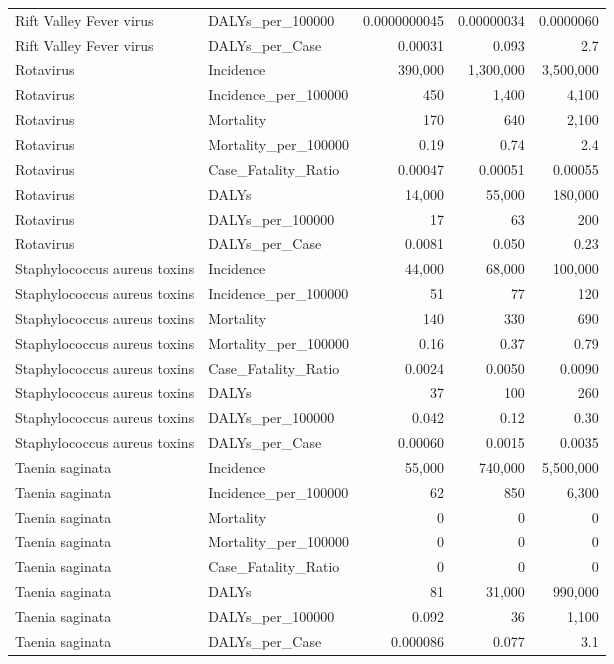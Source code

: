 \documentclass[
  letterpaper,
  DIV=11,
  numbers=noendperiod]{scrartcl}
\begin{document}
\begin{table}
{\begin{tabular*}{\linewidth}{@{\extracolsep{\fill}}llrrr}
Rift Valley Fever virus & DALYs\_per\_100000 & 0.0000000045 & 0.00000034 & 0.0000060 \\ 
Rift Valley Fever virus & DALYs\_per\_Case & 0.00031 & 0.093 & 2.7 \\ 
Rotavirus & Incidence & 390,000 & 1,300,000 & 3,500,000 \\ 
Rotavirus & Incidence\_per\_100000 & 450 & 1,400 & 4,100 \\ 
Rotavirus & Mortality & 170 & 640 & 2,100 \\ 
Rotavirus & Mortality\_per\_100000 & 0.19 & 0.74 & 2.4 \\ 
Rotavirus & Case\_Fatality\_Ratio & 0.00047 & 0.00051 & 0.00055 \\ 
Rotavirus & DALYs & 14,000 & 55,000 & 180,000 \\ 
Rotavirus & DALYs\_per\_100000 & 17 & 63 & 200 \\ 
Rotavirus & DALYs\_per\_Case & 0.0081 & 0.050 & 0.23 \\ 
Staphylococcus aureus toxins & Incidence & 44,000 & 68,000 & 100,000 \\ 
Staphylococcus aureus toxins & Incidence\_per\_100000 & 51 & 77 & 120 \\ 
Staphylococcus aureus toxins & Mortality & 140 & 330 & 690 \\ 
Staphylococcus aureus toxins & Mortality\_per\_100000 & 0.16 & 0.37 & 0.79 \\ 
Staphylococcus aureus toxins & Case\_Fatality\_Ratio & 0.0024 & 0.0050 & 0.0090 \\ 
Staphylococcus aureus toxins & DALYs & 37 & 100 & 260 \\ 
Staphylococcus aureus toxins & DALYs\_per\_100000 & 0.042 & 0.12 & 0.30 \\ 
Staphylococcus aureus toxins & DALYs\_per\_Case & 0.00060 & 0.0015 & 0.0035 \\ 
Taenia saginata & Incidence & 55,000 & 740,000 & 5,500,000 \\ 
Taenia saginata & Incidence\_per\_100000 & 62 & 850 & 6,300 \\ 
Taenia saginata & Mortality & 0 & 0 & 0 \\ 
Taenia saginata & Mortality\_per\_100000 & 0 & 0 & 0 \\ 
Taenia saginata & Case\_Fatality\_Ratio & 0 & 0 & 0 \\ 
Taenia saginata & DALYs & 81 & 31,000 & 990,000 \\ 
Taenia saginata & DALYs\_per\_100000 & 0.092 & 36 & 1,100 \\ 
Taenia saginata & DALYs\_per\_Case & 0.000086 & 0.077 & 3.1 \\ 
\bottomrule
\end{tabular*}

}

\end{table}%
\end{document}
